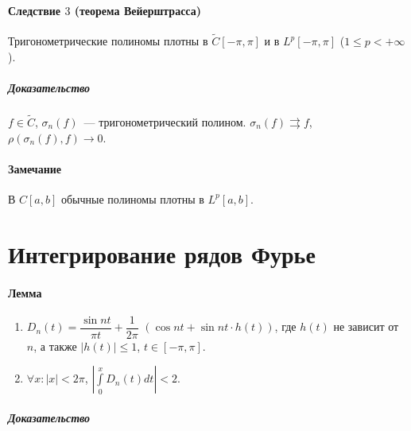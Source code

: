 \documentclass{article}
\begin{document}
            \subsection{Следствие $3$ (теорема Вейерштрасса)}
            
                Тригонометрические полиномы плотны в $\widetilde{C} [-\pi, \pi]$ и в $L^p [-\pi, \pi]$ ($1 \leqslant p < +\infty$).
                
                    \subsubsection{Доказательство}
                    
                    $f \in \widetilde{C}$, $\sigma_n(f)$~--- тригонометрический полином. $\sigma_n(f) \rightrightarrows f$, $\rho(\sigma_n(f), f) \rightarrow 0$.
                    
            \subsection{Замечание}
            
                В $C[a, b]$ обычные полиномы плотны в $L^p[a, b]$.
                
\newpage

\part{Интегрирование рядов Фурье}

    \subsection{Лемма}
    
        \begin{enumerate}
        
            \item $D_n(t) = \dfrac{\sin {nt}}{\pi t} + \dfrac{1}{2 \pi}$ $\left( \cos {nt} + \sin {nt} \cdot h(t) \right)$, где $h(t)$ не зависит от $n$, а также $|h(t)| \leqslant 1$, $t \in [-\pi, \pi]$.
            
            \item $\forall x : |x| < 2 \pi$, $\left| \int\limits_0^x D_n(t) dt \right| < 2$.
            
        \end{enumerate}
        
        \subsubsection{Доказательство}
        
\end{document}
